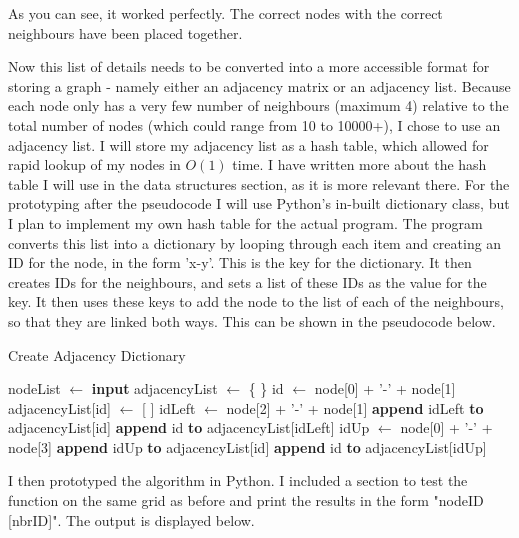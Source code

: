 \documentclass[titlepage]{article}
\begin{document}
As you can see, it worked perfectly. The correct nodes with the correct neighbours have been placed together.

Now this list of details needs to be converted into a more accessible format for storing a graph - namely either an adjacency matrix or an adjacency list. Because each node only has a very few number of neighbours (maximum 4) relative to the total number of nodes (which could range from 10 to 10000+), I chose to use an adjacency list. I will store my adjacency list as a hash table, which allowed for rapid lookup of my nodes in $O(1)$ time. I have written more about the hash table I will use in the data structures section, as it is more relevant there. For the prototyping after the pseudocode I will use Python's in-built dictionary class, but I plan to implement my own hash table for the actual program. The program converts this list into a dictionary by looping through each item and creating an ID for the node, in the form 'x-y'. This is the key for the dictionary. It then creates IDs for the neighbours, and sets a list of these IDs as the value for the key. It then uses these keys to add the node to the list of each of the neighbours, so that they are linked both ways. This can be shown in the pseudocode below. 

\begin{algorithm}[H]
\caption{Create Adjacency Dictionary}
\begin{algorithmic}[1]
    	\State nodeList $\gets$ \textbf{input}
    	\State adjacencyList $\gets$ \{ \}
		\State id $\gets$ node[0] + '-' + node[1]
		\State adjacencyList[id] $\gets$ [ ]
			\State idLeft $\gets$ node[2] + '-' + node[1]
			\State \textbf{append} idLeft \textbf{to} adjacencyList[id]
			\State \textbf{append} id \textbf{to} adjacencyList[idLeft]
		\EndIf
			\State idUp $\gets$ node[0] + '-' + node[3]
			\State \textbf{append} idUp \textbf{to} adjacencyList[id]
			\State \textbf{append} id \textbf{to} adjacencyList[idUp]
		\EndIf
	\EndFor
\end{algorithmic}
\end{algorithm}

I then prototyped the algorithm in Python. I included a section to test the function on the same grid as before and print the results in the form "nodeID [nbrID]". The output is displayed below. 
\end{document}
